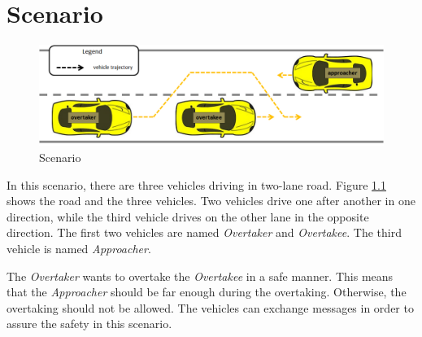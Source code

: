\chapter{Scenario}
\label{chap-scenario-1}

\begin{figure}[H]
\centering
\includegraphics[width=\textwidth]{figures/overtakingWithApproacher.png}
\caption{Scenario}
\label{fig:scenario}
\end{figure}

In this scenario, there are three vehicles driving in two-lane road. Figure \ref{fig:scenario} shows the road and the three vehicles. Two vehicles drive one after another in one direction, while the third vehicle drives on the other lane in the opposite direction. The first two vehicles are named \textit{Overtaker} and \textit{Overtakee}. The third vehicle is named \textit{Approacher}. 

The \textit{Overtaker} wants to overtake the \textit{Overtakee} in a safe manner. This means that the \textit{Approacher} should be far enough during the overtaking. Otherwise, the overtaking should not be allowed. The vehicles can exchange messages in order to assure the safety in this scenario.  

  